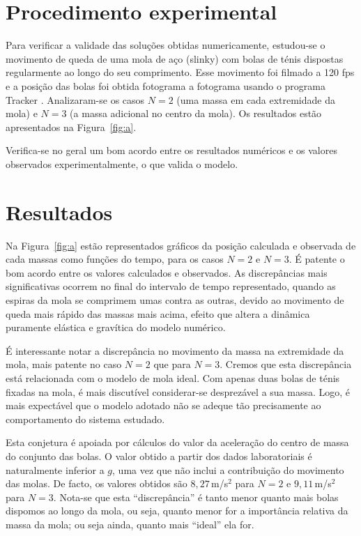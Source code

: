 \documentclass{article}
\begin{document}
\section*{Procedimento experimental}
Para verificar a validade das soluções obtidas numericamente, estudou-se o
movimento de queda de uma mola de aço (slinky) com bolas de ténis dispostas
regularmente ao longo do seu comprimento. Esse movimento foi filmado a 120 fps e
a posição das bolas foi obtida fotograma a fotograma usando o programa Tracker
\cite{Tracker}. Analizaram-se os casos $N=2$ (uma massa em cada extremidade da
mola) e $N=3$ (a massa adicional no centro da mola). Os resultados estão
apresentados na Figura~\ref{fig:a}.

Verifica-se no geral um bom acordo entre os resultados numéricos e os valores
observados experimentalmente, o que valida o modelo.

\section*{Resultados}
Na Figura~\ref{fig:a}  estão representados gráficos da posição calculada e
observada de cada massas como funções do tempo, para os casos $N=2$ e $N=3$. É
patente o bom acordo entre os valores calculados e observados. As discrepâncias
mais significativas ocorrem no final do intervalo de tempo representado, quando
as espiras da mola se comprimem umas contra as outras, devido ao movimento de
queda mais rápido das massas mais acima, efeito que altera a dinâmica puramente
elástica e gravítica do modelo numérico.

É interessante notar a discrepância no movimento da massa na extremidade
da mola, mais patente no caso $N=2$ que para $N=3$. Cremos que esta discrepância
está relacionada com o modelo de mola ideal. Com apenas duas bolas de ténis
fixadas na mola, é mais discutível considerar-se desprezável a sua massa. Logo,
é mais expectável que o modelo adotado não se adeque tão precisamente ao
comportamento do sistema estudado.

Esta conjetura é apoiada por cálculos do valor da aceleração do centro de massa
do conjunto das bolas. O valor obtido a partir dos dados laboratoriais é
naturalmente inferior a $g$, uma vez que não inclui a contribuição do movimento
das molas. De facto, os valores obtidos são $8,27$\,m/s$^2$ para $N=2$ e
$9,11$\,m/s$^2$ para $N=3$.  Nota-se que esta ``discrepância'' é tanto menor
quanto mais bolas dispomos ao longo da mola, ou seja, quanto menor for a
importância relativa da massa da mola; ou seja ainda, quanto mais ``ideal'' ela
for.
\end{document}
